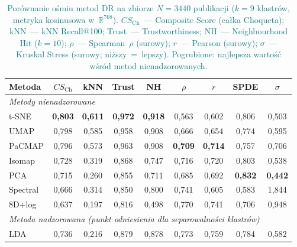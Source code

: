 \documentclass[a4paper,11pt,twocolumn]{article}
\newcommand{\hlme}[1]{\textcolor{teal}{#1}}
\begin{document}
\begin{table}[t]
\centering
\caption{\hlme{Porównanie ośmiu metod DR na zbiorze $N=3440$ publikacji
($k=9$ klastrów, metryka kosinusowa w~$\mathbb{R}^{768}$).
$CS_\text{Ch}$~--- Composite Score (całka Choqueta);
kNN~--- kNN Recall@100; Trust~--- Trustworthiness;
NH~--- Neighbourhood Hit ($k=10$);
$\rho$~--- Spearman~$\rho$ (surowy); $r$~--- Pearson (surowy);
$\sigma$~--- Kruskal Stress (surowy; niższy~=~lepszy).
Pogrubione: najlepsza wartość wśród metod nienadzorowanych.}}
\label{tab:dr}
\small
\setlength{\tabcolsep}{5pt}
\begin{tabular}{@{}lcccccccc@{}}
\toprule
Metoda & $CS_\text{Ch}$ & kNN & Trust & NH & $\rho$ & $r$ & SPDE & $\sigma$ \\
\midrule
\multicolumn{9}{l}{\emph{Metody nienadzorowane}} \\
\midrule
t-SNE     & \textbf{0,803} & \textbf{0,611} & \textbf{0,972} & \textbf{0,918} & 0,563 & 0,602 & 0,806 & 0,503 \\
UMAP      & 0,798          & 0,585          & 0,958          & 0,908          & 0,666 & 0,654 & 0,774 & 0,595 \\
PaCMAP    & 0,796          & 0,573          & 0,963          & 0,908          & \textbf{0,709} & \textbf{0,714} & 0,757 & 0,706 \\
Isomap    & 0,728          & 0,319          & 0,868          & 0,747          & 0,716 & 0,720 & 0,803 & 0,538 \\
PCA       & 0,715          & 0,260          & 0,855          & 0,711          & 0,685 & 0,692 & \textbf{0,832} & \textbf{0,442} \\
Spectral  & 0,666          & 0,314          & 0,850          & 0,800          & 0,741 & 0,605 & 0,583 & 1,844 \\
8D+log    & 0,637          & 0,197          & 0,816          & 0,498          & 0,770 & 0,741 & 0,706 & 0,948 \\
\midrule
\multicolumn{9}{l}{\emph{Metoda nadzorowana (punkt odniesienia dla separowalności klastrów)}} \\
\midrule
LDA       & 0,736          & 0,216          & 0,879          & 0,878          & 0,773 & 0,759 & 0,784 & 0,582 \\
\bottomrule
\end{tabular}
\end{table}
\end{document}

